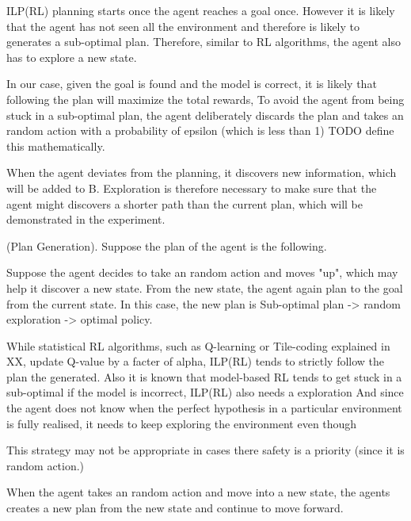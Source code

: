 ILP(RL) planning starts once the agent reaches a goal once. However it is likely that the agent has not seen all the environment
and therefore is likely to generates a sub-optimal plan. Therefore, similar to RL algorithms, the agent also has to explore a new state.

In our case, given the goal is found and the model is correct, it is likely that following the plan will maximize the total rewards, 
To avoid the agent from being stuck in a sub-optimal plan, the agent deliberately discards the plan and takes an random action with a probability of
epsilon (which is less than 1) TODO define this mathematically.

When the agent deviates from the planning, it discovers new information, which will be added to B.
Exploration is therefore necessary to make sure that the agent might discovers a shorter path than the current plan, which will be demonstrated in the experiment.

\begin{examp} \normalfont (Plan Generation).
Suppose the plan of the agent is the following. 

Suppose the agent decides to take an random action and moves "up", which may help it discover a new state. 
From the new state, the agent again plan to the goal from the current state. In this case, the new plan is 
Sub-optimal plan -> random exploration -> optimal policy.

\end{examp}
    

While statistical RL algorithms, such as Q-learning or Tile-coding explained in XX, update Q-value by a facter of alpha, 
ILP(RL) tends to strictly follow the plan the generated. Also it is known that model-based RL tends to get stuck in a sub-optimal if the model is incorrect, ILP(RL) also needs a exploration
And since the agent does not know when the perfect hypothesis in a particular environment is fully realised, it needs to keep exploring the environment even though

This strategy may not be appropriate in cases there safety is a priority (since it is random action.)

When the agent takes an random action and move into a new state, the agents creates a new plan from the new state and continue to move forward.

